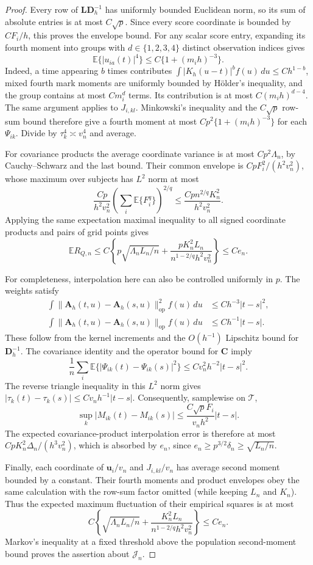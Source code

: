 \documentclass[10pt]{book}
\newcommand{\bu}{{\mathbf u}}
\newcommand{\bA}{{\mathbf A}}
\newcommand{\bC}{{\mathbf C}}
\newcommand{\bD}{{\mathbf D}}
\newcommand{\bL}{{\mathbf L}}
\newcommand{\expect}{\mathbb{E}}
\numberwithin{equation}{section}
\begin{document}
\begin{proof}
Every row of $\bL\bD_h^{-1}$ has uniformly bounded Euclidean norm,
so its sum of absolute entries is at most $C\sqrt p$.
Since every score coordinate is bounded by $CF_i/h$, this proves
the envelope bound.
For any scalar score entry, expanding its fourth moment into groups
with $d\in\{1,2,3,4\}$ distinct observation indices gives
\[
\expect\{|u_{ia}(t)|^4\}\le C\{1+(m_i h)^{-3}\}.
\]
Indeed, a time appearing $b$ times contributes
$\int|K_h(u-t)|^b f(u)\,du\le Ch^{1-b}$, mixed fourth mark
moments are uniformly bounded by H\"older's inequality, and the
group contains at most $Cm_i^d$ terms.  Its contribution is at most
$C(m_i h)^{d-4}$.  The same argument applies to $J_{i,kl}$.
Minkowski's inequality and the $C\sqrt p$ row-sum bound therefore
give a fourth moment at most $Cp^2\{1+(m_i h)^{-3}\}$ for each
$\Psi_{ik}$.  Divide by $\tau_k^4\asymp v_n^4$ and average.

For covariance products the average coordinate variance is at most
$Cp^2\Lambda_n$, by Cauchy--Schwarz and the last bound. Their
common envelope is $CpF_i^2/(h^2v_n^2)$, whose maximum over subjects
has $L^2$ norm at most
\[
\frac{Cp}{h^2v_n^2}
\left(\sum_i\expect\{F_i^q\}\right)^{2/q}
\le\frac{Cp n^{2/q}K_n^2}{h^2v_n^2}.
\]
Applying the same expectation maximal inequality to all signed
coordinate products and pairs of grid points gives
\[
\expect R_{Q,n}\le C\left\{p\sqrt{\Lambda_nL_n/n}
+\frac{pK_n^2L_n}{n^{1-2/q}h^2v_n^2}\right\}\le Ce_n.
\]

For completeness, interpolation here can also be controlled
uniformly in $p$.  The weights satisfy
\begin{align*}
\int\|\bA_h(t,u)-\bA_h(s,u)\|_{\mathrm{op}}^2 f(u)\,du
&\le Ch^{-3}|t-s|^2,\\
\int\|\bA_h(t,u)-\bA_h(s,u)\|_{\mathrm{op}}f(u)\,du
&\le Ch^{-1}|t-s|.
\end{align*}
These follow from the kernel increments and the $O(h^{-1})$
Lipschitz bound for $\bD_h^{-1}$.  The covariance identity and the
operator bound for $\bC$ imply
\[
\frac1n\sum_i\expect\{|\Psi_{ik}(t)-\Psi_{ik}(s)|^2\}
\le Cv_n^2h^{-2}|t-s|^2.
\]
The reverse triangle inequality in this $L^2$ norm gives
$|\tau_k(t)-\tau_k(s)|\le Cv_nh^{-1}|t-s|$.
Consequently, samplewise on $\mathcal T$,
\[
\sup_k|M_{ik}(t)-M_{ik}(s)|
\le\frac{C\sqrt p F_i}{v_nh^2}|t-s|.
\]
The expected covariance-product interpolation error is therefore
at most $CpK_n^2\Delta_n/(h^3v_n^2)$, which is absorbed by $e_n$,
since $e_n\ge p^{3/2}\delta_n\ge\sqrt{L_n/n}$.

Finally, each coordinate of $\bu_i/v_n$ and $J_{i,kl}/v_n$ has
average second moment bounded by a constant.  Their fourth moments
and product envelopes obey the same calculation with the row-sum
factor omitted (while keeping $L_n$ and $K_n$). Thus the expected
maximum fluctuation of their empirical squares is at most
\[
C\left\{\sqrt{\Lambda_nL_n/n}
+\frac{K_n^2L_n}{n^{1-2/q}h^2v_n^2}\right\}\le Ce_n.
\]
Markov's inequality at a fixed threshold above the population
second-moment bound proves the assertion about $\mathcal J_n$.
\end{proof}
\end{document}
